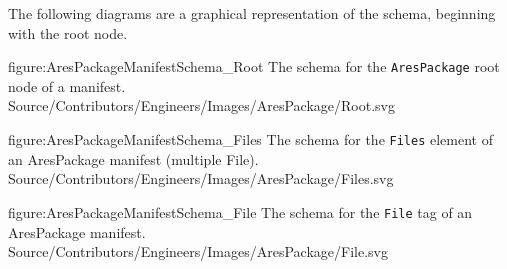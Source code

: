 The following diagrams are a graphical representation of the schema, beginning with the root node.

\FullPageDiagram
    {figure:AresPackageManifestSchema_Root}
    {The schema for the {\tt AresPackage} root node of a manifest.}
    {Source/Contributors/Engineers/Images/AresPackage/Root.svg}

\FullPageDiagram
    {figure:AresPackageManifestSchema_Files}
    {The schema for the {\tt Files} element of an AresPackage manifest (multiple File).}
    {Source/Contributors/Engineers/Images/AresPackage/Files.svg}

\FullPageDiagram
    {figure:AresPackageManifestSchema_File}
    {The schema for the {\tt File} tag of an AresPackage manifest.}
    {Source/Contributors/Engineers/Images/AresPackage/File.svg}

